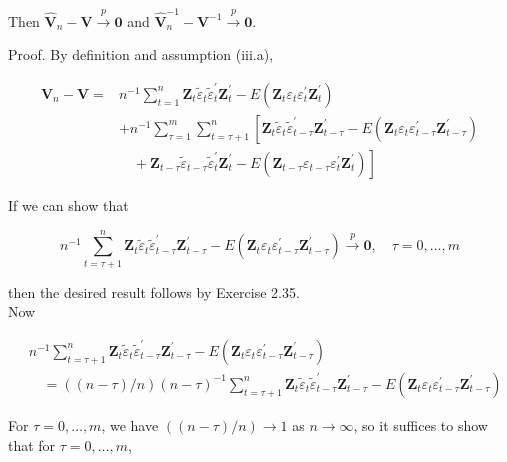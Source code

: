 \documentclass[10pt]{article}
\begin{document}
Then $\hat{\mathbf{V}}_{n}-\mathbf{V} \xrightarrow{p} \mathbf{0}$ and $\hat{\mathbf{V}}_{n}^{-1}-\mathbf{V}^{-1} \xrightarrow{p} \mathbf{0}$.

Proof. By definition and assumption (iii.a),

$$
\begin{aligned}
\hat{\mathbf{V}}_{n}-\mathbf{V}= & n^{-1} \sum_{t=1}^{n} \mathbf{Z}_{t} \tilde{\varepsilon}_{t} \tilde{\varepsilon}_{t}^{\prime} \mathbf{Z}_{t}^{\prime}-E\left(\mathbf{Z}_{t} \varepsilon_{t} \varepsilon_{t}^{\prime} \mathbf{Z}_{t}^{\prime}\right) \\
& +n^{-1} \sum_{\tau=1}^{m} \sum_{t=\tau+1}^{n}\left[\mathbf{Z}_{t} \tilde{\varepsilon}_{t} \tilde{\varepsilon}_{t-\tau}^{\prime} \mathbf{Z}_{t-\tau}^{\prime}-E\left(\mathbf{Z}_{t} \varepsilon_{t} \varepsilon_{t-\tau}^{\prime} \mathbf{Z}_{t-\tau}^{\prime}\right)\right. \\
& \left.\quad+\mathbf{Z}_{t-\tau} \tilde{\varepsilon}_{t-\tau} \tilde{\varepsilon}_{t}^{\prime} \mathbf{Z}_{t}^{\prime}-E\left(\mathbf{Z}_{t-\tau} \varepsilon_{t-\tau} \varepsilon_{t}^{\prime} \mathbf{Z}_{t}^{\prime}\right)\right]
\end{aligned}
$$

If we can show that

$$
n^{-1} \sum_{t=\tau+1}^{n} \mathbf{Z}_{t} \tilde{\varepsilon}_{t} \tilde{\varepsilon}_{t-\tau}^{\prime} \mathbf{Z}_{t-\tau}^{\prime}-E\left(\mathbf{Z}_{t} \varepsilon_{t} \varepsilon_{t-\tau}^{\prime} \mathbf{Z}_{t-\tau}^{\prime}\right) \xrightarrow{p} \mathbf{0}, \quad \tau=0, \ldots, m
$$

then the desired result follows by Exercise 2.35.\\
Now

$$
\begin{aligned}
& n^{-1} \sum_{t=\tau+1}^{n} \mathbf{Z}_{t} \tilde{\varepsilon}_{t} \tilde{\varepsilon}_{t-\tau}^{\prime} \mathbf{Z}_{t-\tau}^{\prime}-E\left(\mathbf{Z}_{t} \varepsilon_{t} \varepsilon_{t-\tau}^{\prime} \mathbf{Z}_{t-\tau}^{\prime}\right) \\
& \quad=((n-\tau) / n)(n-\tau)^{-1} \sum_{t=\tau+1}^{n} \mathbf{Z}_{t} \tilde{\varepsilon}_{t} \tilde{\varepsilon}_{t-\tau}^{\prime} \mathbf{Z}_{t-\tau}^{\prime}-E\left(\mathbf{Z}_{t} \varepsilon_{t} \varepsilon_{t-\tau}^{\prime} \mathbf{Z}_{t-\tau}^{\prime}\right)
\end{aligned}
$$

For $\tau=0, \ldots, m$, we have $((n-\tau) / n) \rightarrow 1$ as $n \rightarrow \infty$, so it suffices to show that for $\tau=0, \ldots, m$,
\end{document}
